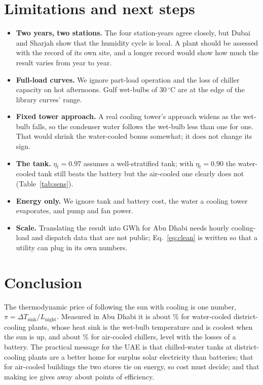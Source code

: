 \documentclass[10pt,a4paper]{article}
\newcommand{\C}{\,^\circ\mathrm{C}}
\begin{document}
\section{Limitations and next steps}\label{sec:lim}
\begin{itemize}
\item \textbf{Two years, two stations.} The four station-years agree closely, but Dubai and Sharjah show that the
humidity cycle is local. A plant should be assessed with the record of its own site, and a longer record would show
how much the result varies from year to year.
\item \textbf{Full-load curves.} We ignore part-load operation and the loss of chiller capacity on hot afternoons.
Gulf wet-bulbs of 30$\C$ are at the edge of the library curves' range.
\item \textbf{Fixed tower approach.} A real cooling tower's approach widens as the wet-bulb falls, so the condenser
water follows the wet-bulb less than one for one. That would shrink the water-cooled bonus somewhat; it does not
change its sign.
\item \textbf{The tank.} $\eta_t=0.97$ assumes a well-stratified tank; with $\eta_t=0.90$ the water-cooled tank still
beats the battery but the air-cooled one clearly does not (Table~\ref{tab:sens}).
\item \textbf{Energy only.} We ignore tank and battery cost, the water a cooling tower evaporates, and pump and fan
power.
\item \textbf{Scale.} Translating the result into GWh for Abu Dhabi needs hourly cooling-load and dispatch data that
are not public; Eq.~\eqref{eq:clean} is written so that a utility can plug in its own numbers.
\end{itemize}

\section{Conclusion}
The thermodynamic price of following the sun with cooling is one number, $\pi=\Delta T_{\text{sink}}/L_{\text{night}}$.
Measured in Abu Dhabi it is about \PiWC\% for water-cooled district-cooling plants, whose heat sink is the wet-bulb
temperature and is coolest when the sun is up, and about \PiAC\% for air-cooled chillers, level with the losses of a
battery. The practical message for the UAE is that chilled-water tanks at district-cooling plants are a better home
for surplus solar electricity than batteries; that for air-cooled buildings the two stores tie on energy, so cost must
decide; and that making ice gives away about \IceLossWC{} points of efficiency.
\end{document}
